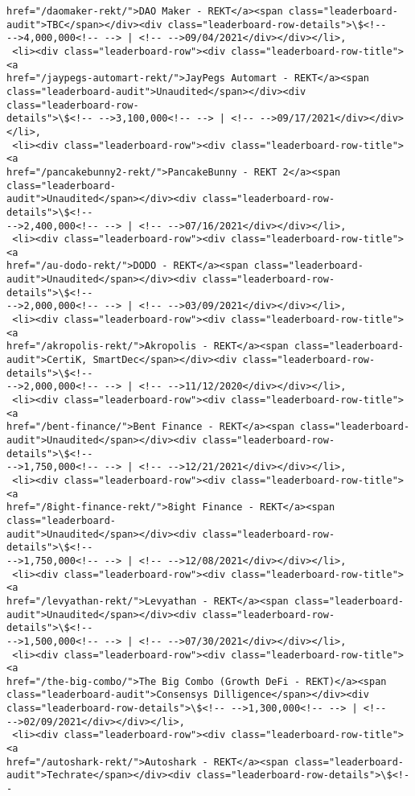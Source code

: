 \documentclass[11pt]{article}
\begin{document}
\begin{tcolorbox}[breakable, size=fbox, boxrule=.5pt, pad at break*=1mm, opacityfill=0]
\begin{Verbatim}[commandchars=\\\{\}]
href="/daomaker-rekt/">DAO Maker - REKT</a><span class="leaderboard-
audit">TBC</span></div><div class="leaderboard-row-details">\$<!--
-->4,000,000<!-- --> | <!-- -->09/04/2021</div></div></li>,
 <li><div class="leaderboard-row"><div class="leaderboard-row-title"><a
href="/jaypegs-automart-rekt/">JayPegs Automart - REKT</a><span
class="leaderboard-audit">Unaudited</span></div><div class="leaderboard-row-
details">\$<!-- -->3,100,000<!-- --> | <!-- -->09/17/2021</div></div></li>,
 <li><div class="leaderboard-row"><div class="leaderboard-row-title"><a
href="/pancakebunny2-rekt/">PancakeBunny - REKT 2</a><span class="leaderboard-
audit">Unaudited</span></div><div class="leaderboard-row-details">\$<!--
-->2,400,000<!-- --> | <!-- -->07/16/2021</div></div></li>,
 <li><div class="leaderboard-row"><div class="leaderboard-row-title"><a
href="/au-dodo-rekt/">DODO - REKT</a><span class="leaderboard-
audit">Unaudited</span></div><div class="leaderboard-row-details">\$<!--
-->2,000,000<!-- --> | <!-- -->03/09/2021</div></div></li>,
 <li><div class="leaderboard-row"><div class="leaderboard-row-title"><a
href="/akropolis-rekt/">Akropolis - REKT</a><span class="leaderboard-
audit">CertiK, SmartDec</span></div><div class="leaderboard-row-details">\$<!--
-->2,000,000<!-- --> | <!-- -->11/12/2020</div></div></li>,
 <li><div class="leaderboard-row"><div class="leaderboard-row-title"><a
href="/bent-finance/">Bent Finance - REKT</a><span class="leaderboard-
audit">Unaudited</span></div><div class="leaderboard-row-details">\$<!--
-->1,750,000<!-- --> | <!-- -->12/21/2021</div></div></li>,
 <li><div class="leaderboard-row"><div class="leaderboard-row-title"><a
href="/8ight-finance-rekt/">8ight Finance - REKT</a><span class="leaderboard-
audit">Unaudited</span></div><div class="leaderboard-row-details">\$<!--
-->1,750,000<!-- --> | <!-- -->12/08/2021</div></div></li>,
 <li><div class="leaderboard-row"><div class="leaderboard-row-title"><a
href="/levyathan-rekt/">Levyathan - REKT</a><span class="leaderboard-
audit">Unaudited</span></div><div class="leaderboard-row-details">\$<!--
-->1,500,000<!-- --> | <!-- -->07/30/2021</div></div></li>,
 <li><div class="leaderboard-row"><div class="leaderboard-row-title"><a
href="/the-big-combo/">The Big Combo (Growth DeFi - REKT)</a><span
class="leaderboard-audit">Consensys Dilligence</span></div><div
class="leaderboard-row-details">\$<!-- -->1,300,000<!-- --> | <!--
-->02/09/2021</div></div></li>,
 <li><div class="leaderboard-row"><div class="leaderboard-row-title"><a
href="/autoshark-rekt/">Autoshark - REKT</a><span class="leaderboard-
audit">Techrate</span></div><div class="leaderboard-row-details">\$<!--

\end{Verbatim}
\end{tcolorbox}
\end{document}
